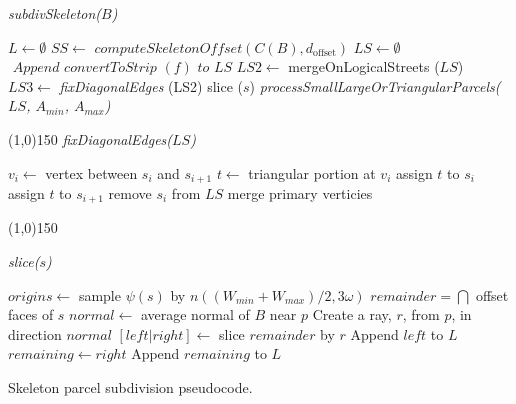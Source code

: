 \begin{algorithm}

\textit{ subdivSkeleton($B$) }
\begin{algorithmic}
\STATE $L \leftarrow \emptyset $
\STATE $SS \leftarrow \textit{ computeSkeletonOffset} (C(B), d_{\text{offset}} )$
\STATE $LS \leftarrow \emptyset $
  \STATE $\textit{ Append convertToStrip } (f) \textit{ to } LS$ 
\ENDFOR
\STATE $LS2 \leftarrow$ mergeOnLogicalStreets ($LS$) 
\STATE $LS3 \leftarrow$ \textit{ fixDiagonalEdges } (LS2)
  \STATE slice ($s$)
\ENDFOR \newline
\textit{ processSmallLargeOrTriangularParcels($LS$, $A_{min}$, $A_{max}$) } 
\end{algorithmic}

\line(1,0){150} \newline
\textit{ fixDiagonalEdges($LS$) }

\begin{algorithmic}
  \STATE $v_i \leftarrow $ vertex between $s_i$ and $s_{i+1}$
  \STATE $t \leftarrow $ triangular portion at $v_i$
    \STATE assign $t$ to $s_i$
  \ENDIF %
    \STATE assign $t$ to $s_{i+1}$
  \ENDIF
\ENDFOR
{}
      \STATE remove $s_i$ from $LS$
      \STATE merge primary verticies
  \ENDIF
\ENDFOR

\end{algorithmic}

\line(1,0){150} \newline


\textit{ slice($s$) }
\begin{algorithmic} 
\STATE $origins \leftarrow$ sample $\psi(s)$ by $n((W_{min}+W_{max})/2, 3\omega)$ 
\STATE $remainder = \bigcap$ offset faces of $s$ %
  \STATE $normal \leftarrow$ average normal of $B$ near $p$
  \STATE Create a ray, $r$, from $p$, in direction $normal$
  \STATE $\left[ left | right \right] \leftarrow$ slice $remainder$ by $r$
  \STATE Append $left$ to $L$
  \STATE $remaining \leftarrow right$ 
\STATE Append $remaining$ to $L$
\ENDFOR
\end{algorithmic}

\caption{
\label{algo:subdivSS}Skeleton parcel subdivision pseudocode.}
\end{algorithm}%


